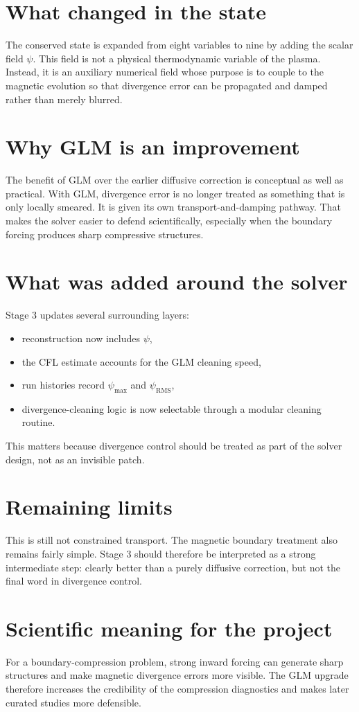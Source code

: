\documentclass[11pt]{article}
\begin{document}
\section{What changed in the state}
The conserved state is expanded from eight variables to nine by adding the scalar field $\psi$. This field is not a physical thermodynamic variable of the plasma. Instead, it is an auxiliary numerical field whose purpose is to couple to the magnetic evolution so that divergence error can be propagated and damped rather than merely blurred.

\section{Why GLM is an improvement}
The benefit of GLM over the earlier diffusive correction is conceptual as well as practical. With GLM, divergence error is no longer treated as something that is only locally smeared. It is given its own transport-and-damping pathway. That makes the solver easier to defend scientifically, especially when the boundary forcing produces sharp compressive structures.

\section{What was added around the solver}
Stage 3 updates several surrounding layers:
\begin{itemize}[leftmargin=1.8em]
    \item reconstruction now includes $\psi$,
    \item the CFL estimate accounts for the GLM cleaning speed,
    \item run histories record $\psi_{\max}$ and $\psi_{\mathrm{RMS}}$,
    \item divergence-cleaning logic is now selectable through a modular cleaning routine.
\end{itemize}
This matters because divergence control should be treated as part of the solver design, not as an invisible patch.

\section{Remaining limits}
This is still not constrained transport. The magnetic boundary treatment also remains fairly simple. Stage 3 should therefore be interpreted as a strong intermediate step: clearly better than a purely diffusive correction, but not the final word in divergence control.

\section{Scientific meaning for the project}
For a boundary-compression problem, strong inward forcing can generate sharp structures and make magnetic divergence errors more visible. The GLM upgrade therefore increases the credibility of the compression diagnostics and makes later curated studies more defensible.
\end{document}

